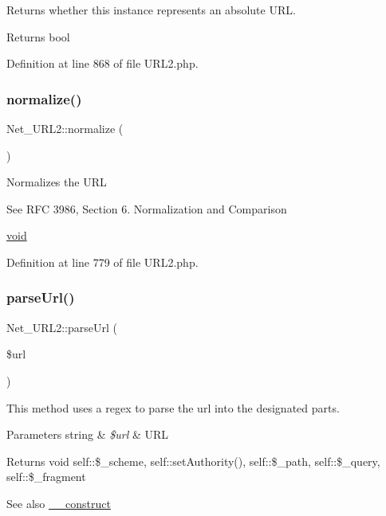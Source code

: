Returns whether this instance represents an absolute U\+RL.

\begin{DoxyReturn}{Returns}
bool 
\end{DoxyReturn}


Definition at line 868 of file U\+R\+L2.\+php.

\mbox{\label{classNet__URL2_a1bde4a2650383694a88eb2f1f061fbc4}} 
\subsubsection{\texorpdfstring{normalize()}{normalize()}}
{\footnotesize\ttfamily Net\+\_\+\+U\+R\+L2\+::normalize (\begin{DoxyParamCaption}{ }\end{DoxyParamCaption})}

Normalizes the U\+RL

See R\+FC 3986, Section 6. Normalization and Comparison

\hyperlink{}{void }

Definition at line 779 of file U\+R\+L2.\+php.

\mbox{\label{classNet__URL2_a498acb2786e9f3074c6d52432de4c9d4}} 
\subsubsection{\texorpdfstring{parse\+Url()}{parseUrl()}}
{\footnotesize\ttfamily Net\+\_\+\+U\+R\+L2\+::parse\+Url (\begin{DoxyParamCaption}\item[{}]{\$url }\end{DoxyParamCaption})\hspace{0.3cm}{\ttfamily [protected]}}

This method uses a regex to parse the url into the designated parts.


\begin{DoxyParams}[1]{Parameters}
string & {\em \$url} & U\+RL\\
\hline
\end{DoxyParams}
\begin{DoxyReturn}{Returns}
void  self\+::\$\+\_\+scheme, self\+::set\+Authority(), self\+::\$\+\_\+path, self\+::\$\+\_\+query, self\+::\$\+\_\+fragment 
\end{DoxyReturn}
\begin{DoxySeeAlso}{See also}
\hyperlink{classNet__URL2_a4c12ff0ddce6621148a4917b8040e567}{\+\_\+\+\_\+construct} 
\end{DoxySeeAlso}


